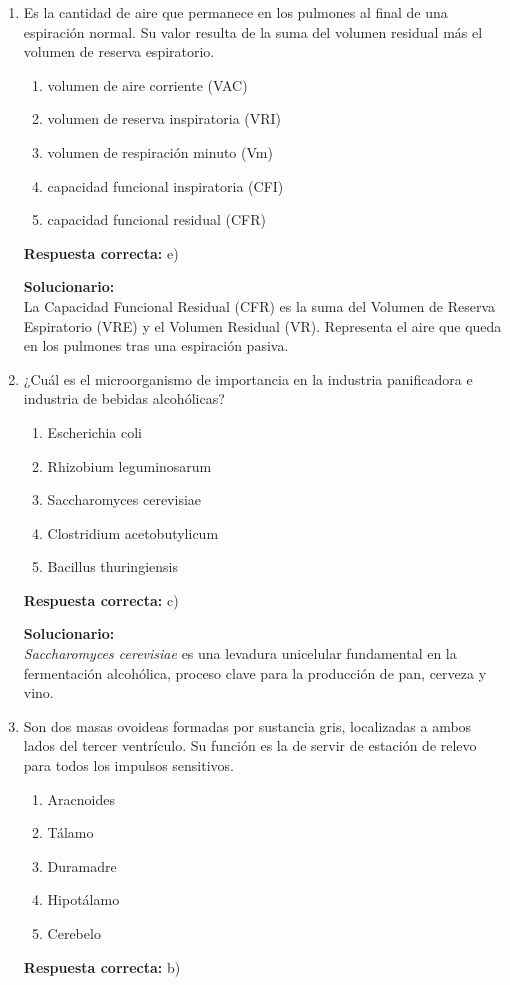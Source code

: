 \begin{enumerate}
	
	\item Es la cantidad de aire que permanece en los pulmones al final de una espiración normal. Su valor resulta de la suma del volumen residual más el volumen de reserva espiratorio.
	\begin{enumerate}[label=\alph*)]
		\item volumen de aire corriente (VAC)
		\item volumen de reserva inspiratoria (VRI)
		\item volumen de respiración minuto (Vm)
		\item capacidad funcional inspiratoria (CFI)
		\item capacidad funcional residual (CFR)
	\end{enumerate}
	\textbf{Respuesta correcta:} e)
	
	\vspace{2mm}
	\textbf{Solucionario:}\\
	La Capacidad Funcional Residual (CFR) es la suma del Volumen de Reserva Espiratorio (VRE) y el Volumen Residual (VR). Representa el aire que queda en los pulmones tras una espiración pasiva.
	
	\vspace{6mm}
	
	\item ¿Cuál es el microorganismo de importancia en la industria panificadora e industria de bebidas alcohólicas?
	\begin{enumerate}[label=\alph*)]
		\item Escherichia coli
		\item Rhizobium leguminosarum
		\item Saccharomyces cerevisiae
		\item Clostridium acetobutylicum
		\item Bacillus thuringiensis
	\end{enumerate}
	\textbf{Respuesta correcta:} c)
	
	\vspace{2mm}
	\textbf{Solucionario:}\\
	\textit{Saccharomyces cerevisiae} es una levadura unicelular fundamental en la fermentación alcohólica, proceso clave para la producción de pan, cerveza y vino.
	
	\vspace{6mm}
	
	\item Son dos masas ovoideas formadas por sustancia gris, localizadas a ambos lados del tercer ventrículo. Su función es la de servir de estación de relevo para todos los impulsos sensitivos.
	\begin{enumerate}[label=\alph*)]
		\item Aracnoides
		\item Tálamo
		\item Duramadre
		\item Hipotálamo
		\item Cerebelo
	\end{enumerate}
	\textbf{Respuesta correcta:} b)
	

\end{enumerate}
